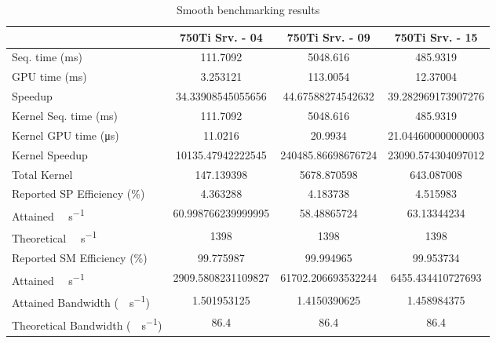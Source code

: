 \begin{table}[H]
	\centering
	\caption{Smooth benchmarking results}
	\label{tab:smooth-results}
	\begin{tabular}{lS[table-format=7.1]S[table-format=7.1]S[table-format=7.1]}
		\toprule
			~ & {\textbf{750Ti Srv. - 04}} & {\textbf{750Ti Srv. - 09}} & {\textbf{750Ti Srv. - 15}} \\
		\midrule
			{Seq. time (\si{\milli\second})} & 111.7092 & 5048.616 & 485.9319 \\
			{GPU time (\si{\milli\second})} & 3.253121 & 113.0054 & 12.37004 \\
			{Speedup} & 34.33908545055656 &44.67588274542632 & 39.282969173907276 \\
		\midrule
			{Kernel Seq. time (\si{\milli\second})} & 111.7092 & 5048.616 & 485.9319 \\
			{Kernel GPU time (\si{\micro\second})} & 11.0216 & 20.9934 & 21.044600000000003 \\
			{Kernel Speedup} & 10135.47942222545 & 240485.86698676724 & 23090.574304097012 \\
		\midrule
			{Total Kernel \si{\mega\flops}} & 147.139398 & 5678.870598 & 643.087008 \\
			{Reported SP Efficiency (\si{\percent})} & 4.363288 & 4.183738 & 4.515983 \\
			{Attained \si{\giga\flops\per\second}} & 60.998766239999995 & 58.48865724 & 63.13344234 \\
			{Theoretical \si{\giga\flops\per\second}} & 1398 & 1398 & 1398 \\
		\midrule
			{Reported SM Efficiency (\si{\percent})} & 99.775987 & 99.994965 & 99.953734 \\
			{Attained \si{\giga\iops\per\second}} & 2909.5808231109827 & 61702.206693532244 & 6455.434410727693 \\			
		\midrule
			{Attained Bandwidth (\si{\giga\byte\per\second})} & 1.501953125 & 1.4150390625  & 1.458984375 \\
			{Theoretical Bandwidth (\si{\giga\byte\per\second})}	& 86.4 & 86.4 & 86.4 \\
		\bottomrule
	\end{tabular}
\end{table}